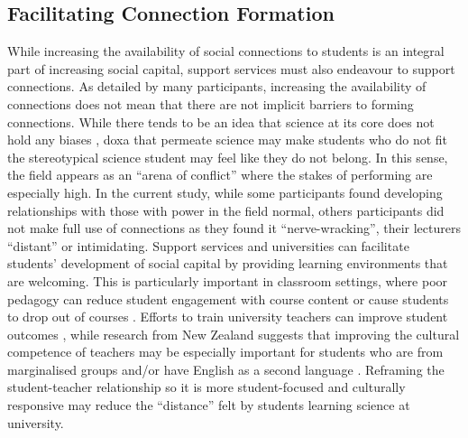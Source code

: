 \subsection{Facilitating Connection Formation}
While increasing the availability of social connections to students is an integral part of increasing social capital, support services must also endeavour to support connections. As detailed by many participants, increasing the availability of connections does not mean that there are not implicit barriers to forming connections. While there tends to be an idea that science at its core does not hold any biases \cite{traweek2009beamtimes}, doxa that permeate science may make students who do not fit the stereotypical science student may feel like they do not belong. In this sense, the field appears as an ``arena of conflict'' \cite[p.1463]{dimaggio1979pierre} where the stakes of performing are especially high. In the current study, while some participants found developing relationships with those with power in the field normal, others participants did not make full use of connections as they found it ``nerve-wracking'', their lecturers ``distant'' or intimidating. Support services and universities can facilitate students' development of social capital by providing learning environments that are welcoming. This is particularly important in classroom settings, where poor pedagogy can reduce student engagement with course content or cause students to  drop out of courses \cite{russell2011factors}. Efforts to train university teachers can improve student outcomes \cite{gibbs2004impact}, while research from New Zealand suggests that improving the cultural competence of teachers may be especially important for students who are from marginalised groups \cite{ikiua2019pasifika} and/or have English as a second language \cite{campbell2008asian}. Reframing the student-teacher relationship so it is more student-focused \cite{gibbs2004impact} and culturally responsive \cite{ikiua2019pasifika} may reduce the ``distance'' felt by students learning science at university.  

